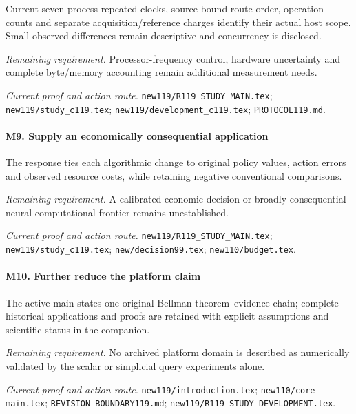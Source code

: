 Current seven-process repeated clocks, source-bound route order, operation counts and separate acquisition/\allowbreak{}reference charges identify their actual host scope. Small observed differences remain descriptive and concurrency is disclosed.

\par\emph{Remaining requirement.} Processor-frequency control, hardware uncertainty and complete byte/\allowbreak{}memory accounting remain additional measurement needs.

\par\emph{Current proof and action route.} \nolinkurl{new119/R119_STUDY_MAIN.tex}; \nolinkurl{new119/study_c119.tex}; \nolinkurl{new119/development_c119.tex}; \nolinkurl{PROTOCOL119.md}.

\paragraph{M9. Supply an economically consequential application}

The response ties each algorithmic change to original policy values, action errors and observed resource costs, while retaining negative conventional comparisons.

\par\emph{Remaining requirement.} A calibrated economic decision or broadly consequential neural computational frontier remains unestablished.

\par\emph{Current proof and action route.} \nolinkurl{new119/R119_STUDY_MAIN.tex}; \nolinkurl{new119/study_c119.tex}; \nolinkurl{new/decision99.tex}; \nolinkurl{new110/budget.tex}.

\paragraph{M10. Further reduce the platform claim}

The active main states one original Bellman theorem--evidence chain; complete historical applications and proofs are retained with explicit assumptions and scientific status in the companion.

\par\emph{Remaining requirement.} No archived platform domain is described as numerically validated by the scalar or simplicial query experiments alone.

\par\emph{Current proof and action route.} \nolinkurl{new119/introduction.tex}; \nolinkurl{new110/core-main.tex}; \nolinkurl{REVISION_BOUNDARY119.md}; \nolinkurl{new119/R119_STUDY_DEVELOPMENT.tex}.

